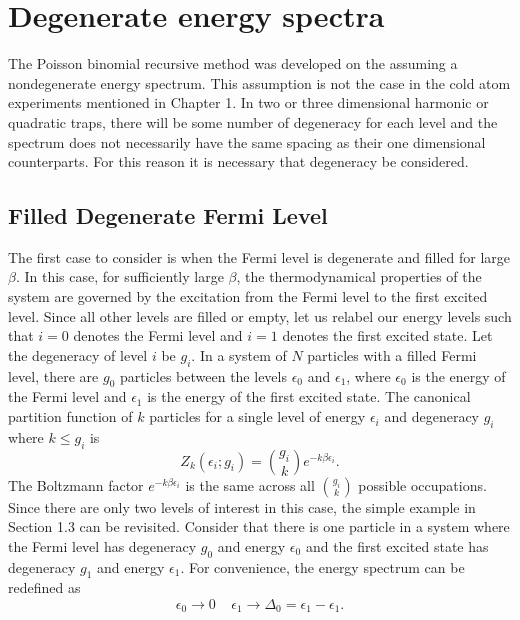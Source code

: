 \section{Degenerate energy spectra}
The Poisson binomial recursive method was developed on the assuming a nondegenerate energy spectrum. This assumption is not the case in the cold atom experiments mentioned in Chapter 1. In two or three dimensional harmonic or quadratic traps, there will be some number of degeneracy for each level and the spectrum does not necessarily have the same spacing as their one dimensional counterparts. For this reason it is necessary that degeneracy be considered. 


\subsection{Filled Degenerate Fermi Level}
The first case to consider is when the Fermi level is degenerate and filled for large $\beta$. In this case, for sufficiently large $\beta$, the thermodynamical properties of the  system are governed by the excitation from the Fermi level to the first excited level. Since all other levels are filled or empty, let us relabel our energy levels such that $i=0$ denotes the Fermi level and $i=1$ denotes the first excited state. Let the degeneracy of level $i$ be $g_i$. In a system of $N$ particles with a filled Fermi level, there are $g_0$ particles between the levels $\epsilon_0$ and $\epsilon_1$, where $\epsilon_0$ is the energy of the Fermi level and $\epsilon_1$ is the energy of the first excited state. The canonical partition function of $k$ particles for a single level of energy $\epsilon_i$ and degeneracy $g_i$ where $k\leq g_i$ is 
\begin{equation}
    Z_k(\epsilon_i;g_i)={g_i \choose k} e^{-k\beta\epsilon_i}.
    \label{eq:ZNsinglelevel}
\end{equation}
The Boltzmann factor $e^{-k\beta\epsilon_i}$ is the same across all ${g_i \choose k}$ possible occupations. Since there are only two levels of interest in this case, the simple example in Section 1.3 can be revisited. Consider that there is one particle in a system where the Fermi level has degeneracy $g_0$ and energy $\epsilon_0$ and the first excited state has degeneracy $g_1$ and energy $\epsilon_1$. For convenience, the energy spectrum can be redefined as
\begin{equation}
    \epsilon_0 \xrightarrow[]{} 0\ \ \ \ \ \epsilon_1\xrightarrow[]{}\Delta_0=\epsilon_1-\epsilon_1.\nonumber
\end{equation}
